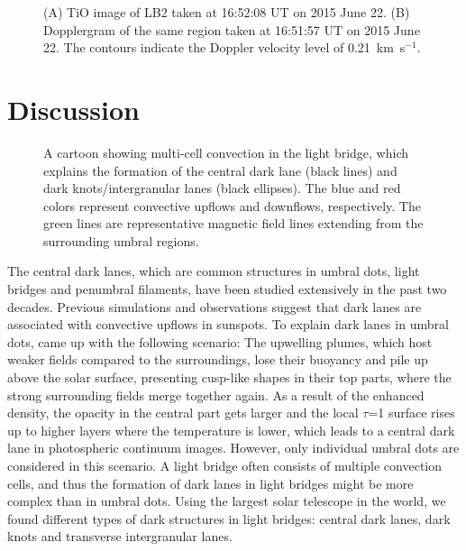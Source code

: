\documentclass[preprint2]{aastex}
\begin{document}
\begin{figure*}
 \caption{ (A) TiO image of LB2 taken at 16:52:08 UT on 2015 June 22. (B) Dopplergram of the same region taken at 16:51:57 UT on 2015 June 22. The contours indicate the Doppler velocity level of 0.21~km~s$^{-1}$.}\label{fig.5}
\end{figure*}




\section{Discussion}


\begin{figure*}
 \caption{ A cartoon showing multi-cell convection in the light bridge, which explains the formation of the central dark lane (black lines) and dark knots/intergranular lanes (black ellipses). The blue and red colors represent convective upflows and downflows, respectively. The green lines are representative magnetic field lines extending from the surrounding umbral regions. }\label{fig.6}
\end{figure*}


The central dark lanes, which are common structures in umbral dots, light bridges and penumbral filaments, have been studied extensively in the past two decades. Previous simulations and observations suggest that dark lanes are associated with convective upflows in sunspots. To explain dark lanes in umbral dots, \cite{SchusslerandVolger} came up with the following scenario: The upwelling plumes, which host weaker fields compared to the surroundings, lose their buoyancy and pile up above the solar surface, presenting cusp-like shapes in their top parts, where the strong surrounding fields merge together again. As a result of the enhanced density, the opacity in the central part gets larger and the local $\tau$=1 surface rises up to higher layers where the temperature is lower, which leads to a central dark lane in photospheric continuum images. However, only individual umbral dots are considered in this scenario. A light bridge often consists of multiple convection cells, and thus the formation of dark lanes in light bridges might be more complex than in umbral dots. Using the largest solar telescope in the world, we found different types of dark structures in light bridges: central dark lanes, dark knots and transverse intergranular lanes.
\end{document}
